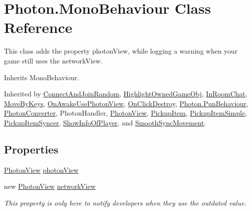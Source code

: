 \hypertarget{class_photon_1_1_mono_behaviour}{}\section{Photon.\+Mono\+Behaviour Class Reference}
\label{class_photon_1_1_mono_behaviour}


This class adds the property photon\+View, while logging a warning when your game still uses the network\+View.  




Inherits Mono\+Behaviour.



Inherited by \hyperlink{class_connect_and_join_random}{Connect\+And\+Join\+Random}, \hyperlink{class_highlight_owned_game_obj}{Highlight\+Owned\+Game\+Obj}, \hyperlink{class_in_room_chat}{In\+Room\+Chat}, \hyperlink{class_move_by_keys}{Move\+By\+Keys}, \hyperlink{class_on_awake_use_photon_view}{On\+Awake\+Use\+Photon\+View}, \hyperlink{class_on_click_destroy}{On\+Click\+Destroy}, \hyperlink{class_photon_1_1_pun_behaviour}{Photon.\+Pun\+Behaviour}, \hyperlink{class_photon_converter}{Photon\+Converter}, Photon\+Handler, \hyperlink{class_photon_view}{Photon\+View}, \hyperlink{class_pickup_item}{Pickup\+Item}, \hyperlink{class_pickup_item_simple}{Pickup\+Item\+Simple}, \hyperlink{class_pickup_item_syncer}{Pickup\+Item\+Syncer}, \hyperlink{class_show_info_of_player}{Show\+Info\+Of\+Player}, and \hyperlink{class_smooth_sync_movement}{Smooth\+Sync\+Movement}.

\subsection*{Properties}
\begin{DoxyCompactItemize}
\item 
\hyperlink{class_photon_view}{Photon\+View} \hyperlink{class_photon_1_1_mono_behaviour_a27027ef7d8204896cb9381a200953892}{photon\+View}
\item 
new \hyperlink{class_photon_view}{Photon\+View} \hyperlink{class_photon_1_1_mono_behaviour_a00c97185c3a8594bf5c1c518a701706e}{network\+View}
\begin{DoxyCompactList}\small\item\em This property is only here to notify developers when they use the outdated value. \end{DoxyCompactList}\end{DoxyCompactItemize}


